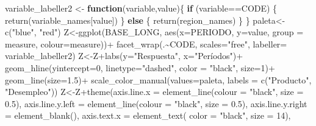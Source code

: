 \documentclass[
]{book}
\newenvironment{Shaded}{\begin{snugshade}}{\end{snugshade}}
\newcommand{\AttributeTok}[1]{\textcolor[rgb]{0.77,0.63,0.00}{#1}}
\newcommand{\ControlFlowTok}[1]{\textcolor[rgb]{0.13,0.29,0.53}{\textbf{#1}}}
\newcommand{\DecValTok}[1]{\textcolor[rgb]{0.00,0.00,0.81}{#1}}
\newcommand{\FloatTok}[1]{\textcolor[rgb]{0.00,0.00,0.81}{#1}}
\newcommand{\FunctionTok}[1]{\textcolor[rgb]{0.00,0.00,0.00}{#1}}
\newcommand{\NormalTok}[1]{#1}
\newcommand{\OtherTok}[1]{\textcolor[rgb]{0.56,0.35,0.01}{#1}}
\newcommand{\SpecialCharTok}[1]{\textcolor[rgb]{0.00,0.00,0.00}{#1}}
\newcommand{\StringTok}[1]{\textcolor[rgb]{0.31,0.60,0.02}{#1}}
\begin{document}
\begin{Shaded}
\begin{Highlighting}[]
\NormalTok{variable\_labeller2 }\OtherTok{\textless{}{-}} \ControlFlowTok{function}\NormalTok{(variable,value)\{}
  \ControlFlowTok{if}\NormalTok{ (variable}\SpecialCharTok{==}\StringTok{\textquotesingle{}CODE\textquotesingle{}}\NormalTok{) \{}
    \FunctionTok{return}\NormalTok{(variable\_names[value])}
\NormalTok{  \} }\ControlFlowTok{else}\NormalTok{ \{}
    \FunctionTok{return}\NormalTok{(region\_names)}
\NormalTok{  \}}
\NormalTok{\}}
\NormalTok{paleta}\OtherTok{\textless{}{-}}\FunctionTok{c}\NormalTok{(}\StringTok{"blue"}\NormalTok{, }\StringTok{"red"}\NormalTok{)}
\NormalTok{Z}\OtherTok{\textless{}{-}}\FunctionTok{ggplot}\NormalTok{(BASE\_LONG, }\FunctionTok{aes}\NormalTok{(}\AttributeTok{x=}\NormalTok{PERIODO, }\AttributeTok{y=}\NormalTok{value, }\AttributeTok{group =}\NormalTok{ measure,}
                         \AttributeTok{colour=}\NormalTok{measure))}\SpecialCharTok{+}
  \FunctionTok{facet\_wrap}\NormalTok{(.}\SpecialCharTok{\textasciitilde{}}\NormalTok{CODE, }\AttributeTok{scales=}\StringTok{"free"}\NormalTok{, }\AttributeTok{labeller=}\NormalTok{ variable\_labeller2)}
\NormalTok{Z}\OtherTok{\textless{}{-}}\NormalTok{Z}\SpecialCharTok{+}\FunctionTok{labs}\NormalTok{(}\AttributeTok{y=}\StringTok{"Respuesta"}\NormalTok{,}
          \AttributeTok{x=}\StringTok{"Períodos"}\NormalTok{)}\SpecialCharTok{+}
  \FunctionTok{geom\_hline}\NormalTok{(}\AttributeTok{yintercept=}\DecValTok{0}\NormalTok{, }\AttributeTok{linetype=}\StringTok{"dashed"}\NormalTok{,}
             \AttributeTok{color =} \StringTok{"black"}\NormalTok{, }\AttributeTok{size=}\DecValTok{1}\NormalTok{)}\SpecialCharTok{+}
  \FunctionTok{geom\_line}\NormalTok{(}\AttributeTok{size=}\FloatTok{1.5}\NormalTok{)}\SpecialCharTok{+}
  \FunctionTok{scale\_color\_manual}\NormalTok{(}\AttributeTok{values=}\NormalTok{paleta,}
                     \AttributeTok{labels =} \FunctionTok{c}\NormalTok{(}\StringTok{"Producto"}\NormalTok{, }
                                \StringTok{"Desempleo"}\NormalTok{))}
\NormalTok{Z}\OtherTok{\textless{}{-}}\NormalTok{Z}\SpecialCharTok{+}\FunctionTok{theme}\NormalTok{(}\AttributeTok{axis.line.x =} \FunctionTok{element\_line}\NormalTok{(}\AttributeTok{colour =} \StringTok{"black"}\NormalTok{, }\AttributeTok{size =} \FloatTok{0.5}\NormalTok{),}
           \AttributeTok{axis.line.y.left  =} \FunctionTok{element\_line}\NormalTok{(}\AttributeTok{colour =} \StringTok{"black"}\NormalTok{, }\AttributeTok{size =} \FloatTok{0.5}\NormalTok{),}
           \AttributeTok{axis.line.y.right =} \FunctionTok{element\_blank}\NormalTok{(),}
           \AttributeTok{axis.text.x =} \FunctionTok{element\_text}\NormalTok{( }\AttributeTok{color =} \StringTok{"black"}\NormalTok{, }\AttributeTok{size =} \DecValTok{14}\NormalTok{),}

\end{Highlighting}
\end{Shaded}
\end{document}
